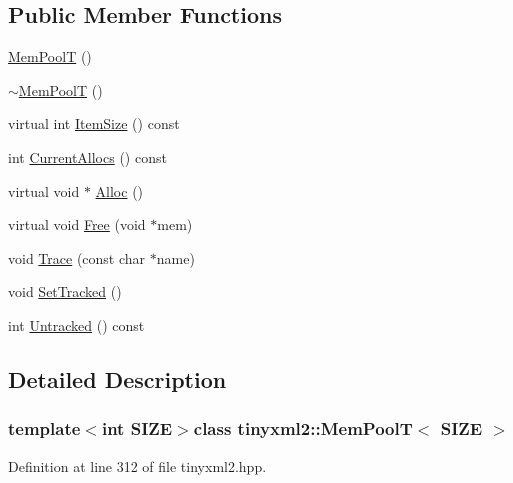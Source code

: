 \subsection*{Public Member Functions}
\begin{DoxyCompactItemize}
\item 
\hyperlink{classtinyxml2_1_1_mem_pool_t_a8a69a269ea72e292dde65309528ef64b}{Mem\-Pool\-T} ()
\item 
\hyperlink{classtinyxml2_1_1_mem_pool_t_ad6bb8346ad5b9a34f8f0051da5e3ed3f}{$\sim$\-Mem\-Pool\-T} ()
\item 
virtual int \hyperlink{classtinyxml2_1_1_mem_pool_t_a7ec8778fe99f6e332615a703be0b48bc}{Item\-Size} () const 
\item 
int \hyperlink{classtinyxml2_1_1_mem_pool_t_a56be11b7db6a7ef00db17088a7769aab}{Current\-Allocs} () const 
\item 
virtual void $\ast$ \hyperlink{classtinyxml2_1_1_mem_pool_t_aa9d785a48ffe6ea1be679bab13464486}{Alloc} ()
\item 
virtual void \hyperlink{classtinyxml2_1_1_mem_pool_t_a4f1a0c434e9e3d7391e5c16ed4ee8c70}{Free} (void $\ast$mem)
\item 
void \hyperlink{classtinyxml2_1_1_mem_pool_t_a0bc596f271e0f139822c534238b3f244}{Trace} (const char $\ast$name)
\item 
void \hyperlink{classtinyxml2_1_1_mem_pool_t_a7798932414916199a1bc0f9c3f368521}{Set\-Tracked} ()
\item 
int \hyperlink{classtinyxml2_1_1_mem_pool_t_a524b90d0edeac41964c06510757dce0f}{Untracked} () const 
\end{DoxyCompactItemize}


\subsection{Detailed Description}
\subsubsection*{template$<$int S\-I\-Z\-E$>$class tinyxml2\-::\-Mem\-Pool\-T$<$ S\-I\-Z\-E $>$}



Definition at line 312 of file tinyxml2.\-hpp.




